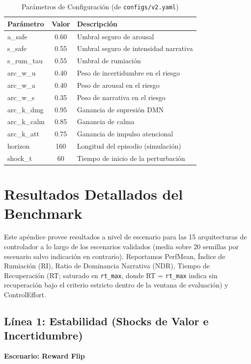 \documentclass{article}
\newcommand{\scenarioheader}[1]{\Needspace{20\baselineskip}\textbf{Escenario: #1}}
\begin{document}
\begin{table}[htbp]
\centering
\caption{Parámetros de Configuración (de \texttt{configs/v2.yaml})}
\label{tab:config}
\begin{tabular}{@{}lcl@{}}
\toprule
Parámetro & Valor & Descripción \\ \midrule
a\_safe & 0.60 & Umbral seguro de arousal \\
s\_safe & 0.55 & Umbral seguro de intensidad narrativa \\
s\_rum\_tau & 0.55 & Umbral de rumiación \\
arc\_w\_u & 0.40 & Peso de incertidumbre en el riesgo \\
arc\_w\_a & 0.40 & Peso de arousal en el riesgo \\
arc\_w\_s & 0.35 & Peso de narrativa en el riesgo \\
arc\_k\_dmg & 0.95 & Ganancia de supresión DMN \\
arc\_k\_calm & 0.85 & Ganancia de calma \\
arc\_k\_att & 0.75 & Ganancia de impulso atencional \\
horizon & 160 & Longitud del episodio (simulación) \\
shock\_t & 60 & Tiempo de inicio de la perturbación \\ \bottomrule
\end{tabular}
\end{table}

\section{Resultados Detallados del Benchmark}
Este apéndice provee resultados a nivel de escenario para las 15 arquitecturas de controlador a lo largo de los escenarios validados (media sobre 20 semillas por escenario salvo indicación en contrario). Reportamos PerfMean, Índice de Rumiación (RI), Ratio de Dominancia Narrativa (NDR), Tiempo de Recuperación (RT; saturado en \texttt{rt\_max}, donde RT = \texttt{rt\_max} indica sin recuperación bajo el criterio estricto dentro de la ventana de evaluación) y ControlEffort.

\subsection{Línea 1: Estabilidad (Shocks de Valor e Incertidumbre)}

\scenarioheader{Reward Flip}
\end{document}

